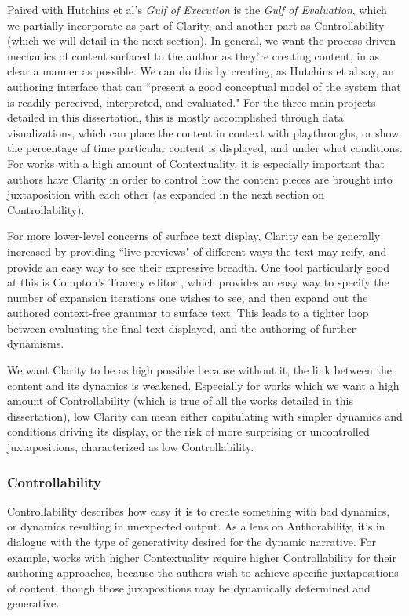 Paired with Hutchins et al's \textit{Gulf of Execution} is the \textit{Gulf of Evaluation}, which we partially incorporate as part of Clarity, and another part as Controllability (which we will detail in the next section). In general, we want the process-driven mechanics of content surfaced to the author as they're creating content, in as clear a manner as possible. We can do this by creating, as Hutchins et al say, an authoring interface that can ``present a good conceptual model of the system that is readily perceived, interpreted, and evaluated." For the three main projects detailed in this dissertation, this is mostly accomplished through data visualizations, which can place the content in context with playthroughs, or show the percentage of time particular content is displayed, and under what conditions. For works with a high amount of Contextuality, it is especially important that authors have Clarity in order to control how the content pieces are brought into juxtaposition with each other (as expanded in the next section on Controllability). 

For more lower-level concerns of surface text display, Clarity can be generally increased by providing ``live previews" of different ways the text may reify, and provide an easy way to see their expressive breadth. One tool particularly good at this is Compton's Tracery editor \cite{compton2015tracery}, which provides an easy way to specify the number of expansion iterations one wishes to see, and then expand out the authored context-free grammar to surface text. This leads to a tighter loop between evaluating the final text displayed, and the authoring of further dynamisms.

We want Clarity to be as high possible because without it, the link between the content and its dynamics is weakened. Especially for works which we want a high amount of Controllability (which is true of all the works detailed in this dissertation), low Clarity can mean either capitulating with simpler dynamics and conditions driving its display, or the risk of more surprising or uncontrolled juxtapositions, characterized as low Controllability.

\subsubsection{Controllability}
\label{intro:controllability}

Controllability describes how easy it is to create something with bad dynamics, or dynamics resulting in unexpected output. As a lens on Authorability, it's in dialogue with the type of generativity desired for the dynamic narrative. For example, works with higher Contextuality require higher Controllability for their authoring approaches, because the authors wish to achieve specific juxtapositions of content, though those juxapositions may be dynamically determined and generative.

